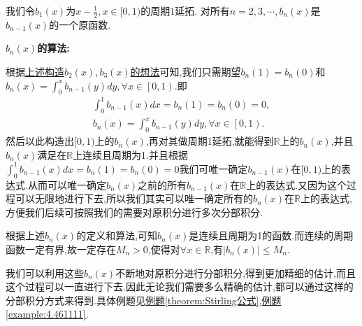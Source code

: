 \documentclass[../../main.tex]{subfiles}
\begin{document}
\begin{definition}[\(b_n(x)\)定义和算法]\label{definition:b_n(x)定义和算法}
我们令\(b_1(x)\)为\(x-\frac{1}{2},x\in[0,1)\)的周期\(1\)延拓. 对所有\(n=2,3,\cdots,b_n(x)\)是\(b_{n - 1}(x)\)的一个原函数.
\end{definition}
\begin{note}
\textbf{\(b_n(x)\)的算法:}

根据\hyperlink{remark:利用0阶E-M公式精细估阶的构造}{上述构造$b_2(x),b_3(x)$的想法}可知,我们只需期望\(b_n(1)=b_n(0)\)和$b_n(x)=\int_0^x{b_{n-1}\left( y \right) dy},\forall x\in \left[ 0,1 \right) $.即
\begin{gather*}
\int_{0}^{1}b_{n-1}(x)dx =b_n(1)=b_n(0)= 0,
\\
b_n(x)=\int_0^x{b_{n-1}\left( y \right) dy},\forall x\in \left[ 0,1 \right).
\end{gather*}
然后以此构造出$[0,1)$上的$b_n(x)$,再对其做周期1延拓,就能得到$\mathbb{R}$上的$b_n(x)$,并且$b_n(x)$满足在$\mathbb{R}$上连续且周期为1.并且根据$\int_{0}^{1}b_{n-1}(x)dx =b_n(1)=b_n(0)= 0$我们可唯一确定\(b_{n-1}(x)\)在\([0,1)\)上的表达式.从而可以唯一确定$b_n(x)$之前的所有\(b_{n-1}(x)\)在\(\mathbb{R}\)上的表达式.又因为这个过程可以无限地进行下去,所以我们其实可以唯一确定所有的\(b_n(x)\)在\(\mathbb{R}\)上的表达式,方便我们后续可按照我们的需要对原积分进行多次分部积分.

根据上述$b_n(x)$的定义和算法,可知$b_n(x)$是连续且周期为1的函数.而连续的周期函数一定有界,故一定存在$M_n>0$,使得对$\forall x\in \mathbb{R}$,有$\left| b_n(x) \right|\leqslant M_n$.
\end{note}
\begin{remark}
我们可以利用这些$b_n(x)$不断地对原积分进行分部积分,得到更加精细的估计,而且这个过程可以一直进行下去.因此无论我们需要多么精确的估计,都可以通过这样的分部积分方式来得到.具体例题见\hyperref[theorem:Stirling公式]{例题\ref{theorem:Stirling公式}},\hyperref[example:4.461111]{例题\ref{example:4.461111}}.
\end{remark}
\end{document}
